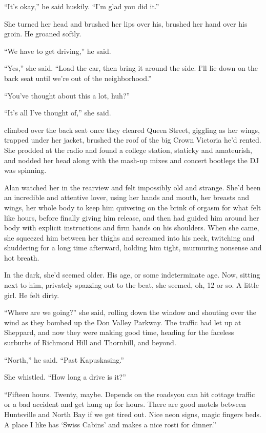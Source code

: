 ``It's okay,'' he said huskily.  ``I'm glad you did it.''

She turned her head and brushed her lips over his, brushed her hand
over his groin.  He groaned softly.

``We have to get driving,'' he said.

``Yes,'' she said.  ``Load the car, then bring it around the side. 
I'll lie down on the back seat until we're out of the neighborhood.''

``You've thought about this a lot, huh?''

``It's all I've thought of,'' she said.

 climbed over the back seat once they cleared Queen Street,
giggling as her wings, trapped under her jacket, brushed the roof of
the big Crown Victoria he'd rented.  She prodded at the radio and
found a college station, staticky and amateurish, and nodded her head
along with the mash-up mixes and concert bootlegs the DJ was spinning.

Alan watched her in the rearview and felt impossibly old and strange. 
She'd been an incredible and attentive lover, using her hands and
mouth, her breasts and wings, her whole body to keep him quivering on
the brink of orgasm for what felt like hours, before finally giving
him release, and then had guided him around her body with explicit
instructions and firm hands on his shoulders.  When she came, she
squeezed him between her thighs and screamed into his neck, twitching
and shuddering for a long time afterward, holding him tight, murmuring
nonsense and hot breath.

In the dark, she'd seemed older.  His age, or some indeterminate age. 
Now, sitting next to him, privately spazzing out to the beat, she
seemed, oh, 12 or so.  A little girl.  He felt dirty.

``Where are we going?'' she said, rolling down the window and shouting
over the wind as they bombed up the Don Valley Parkway.  The traffic
had let up at Sheppard, and now they were making good time, heading
for the faceless surburbs of Richmond Hill and Thornhill, and beyond.

``North,'' he said.  ``Past Kapuskasing.''

She whistled.  ``How long a drive is it?''

``Fifteen hours.  Twenty, maybe.  Depends on the roads\dash{}you can hit
cottage traffic or a bad accident and get hung up for hours.  There
are good motels between Huntsville and North Bay if we get tired out. 
Nice neon signs, magic fingers beds.  A place I like has `Swiss
Cabins' and makes a nice rosti for dinner.''

